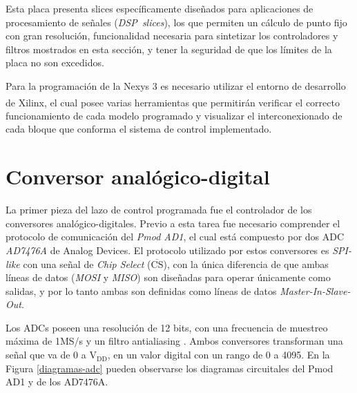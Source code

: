 Esta placa presenta slices específicamente diseñados para aplicaciones de procesamiento de señales (\mbox{\emph{DSP slices}}), los que permiten un cálculo de punto fijo con gran resolución, funcionalidad necesaria para sintetizar los controladores y filtros mostrados en esta sección, y tener la seguridad de que los límites de la placa no son excedidos.

Para la programación de la Nexys 3 es necesario utilizar el entorno de desarrollo de Xilinx\textsuperscript\textregistered \hspace{0.6pt}, el cual posee varias herramientas que permitirán verificar el correcto funcionamiento de cada modelo programado y visualizar el interconexionado de cada bloque que conforma el sistema de control implementado. 

\section{Conversor analógico-digital}

La primer pieza del lazo de control programada fue el controlador de los conversores analógico-digitales. Previo a esta tarea fue necesario comprender el protocolo de comunicación del \emph{Pmod AD1}, el cual está compuesto por dos ADC \emph{AD7476A} de Analog Devices. El protocolo utilizado por estos conversores es \emph{SPI-like} con una señal de \emph{Chip Select} ($\overline{\mbox{CS}}$), con la única diferencia de que ambas líneas de datos (\emph{MOSI} y \emph{MISO}) son diseñadas para operar únicamente como salidas, y por lo tanto ambas son definidas como líneas de datos \emph{Master-In-Slave-Out}.

Los ADCs poseen una resolución de 12 bits, con una frecuencia de muestreo máxima de 1MS/s y un filtro antialiasing \cite{ad7476a}. Ambos conversores transforman una señal que va de 0 a $\mathrm{V_{DD}}$, en un valor digital con un rango de 0 a 4095. En la Figura \ref{diagramas-adc} pueden observarse los diagramas circuitales del Pmod AD1 y de los AD7476A.

